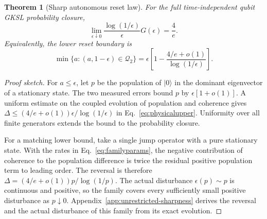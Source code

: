 \documentclass[aps,pra,reprint,amsmath,amssymb,nofootinbib,floatfix,longbibliography]{revtex4-2}
\theoremstyle{aps}
\newtheorem{theorem}{Theorem}
\newcommand{\Q}{\mathcal Q_2}
\newcommand{\eps}{\epsilon}
\newcommand{\ket}[1]{|#1\rangle}
\begin{document}
\begin{theorem}[Sharp autonomous reset law]\label{thm:main}
For the full time-independent qubit GKSL probability closure,
\begin{equation}\label{eq:main}
 \lim_{\eps\downarrow0}\frac{\log(1/\eps)}{\eps}G(\eps)=\frac4e.
\end{equation}
Equivalently, the lower reset boundary is
\begin{equation}\label{eq:boundary}
 \min\{a:(a,1-\eps)\in\Q\}
 =\eps\left[1-\frac{4/e+o(1)}{\log(1/\eps)}\right].
\end{equation}
\end{theorem}
\begin{proof}[Proof sketch]
For $a\le\eps$, let $p$ be the population of $\ket0$ in the dominant eigenvector of a stationary state. The two measured errors bound $p$ by $\eps[1+o(1)]$. A uniform estimate on the coupled evolution of population and coherence gives $\Delta\le(4/e+o(1))\eps/\log(1/\eps)$ in Eq.~\eqref{eq:physicalupper}. Uniformity over all finite generators extends the bound to the probability closure.

For a matching lower bound, take a single jump operator with a pure stationary state. With the rates in Eq.~\eqref{eq:familyparams}, the negative contribution of coherence to the population difference is twice the residual positive population term to leading order. The reversal is therefore $\Delta=(4/e+o(1))p/\log(1/p)$. The actual disturbance $\eps(p)\sim p$ is continuous and positive, so the family covers every sufficiently small positive disturbance as $p\downarrow0$. Appendix~\ref{app:unrestricted-sharpness} derives the reversal and the actual disturbance of this family from its exact evolution.
\end{proof}
\end{document}
